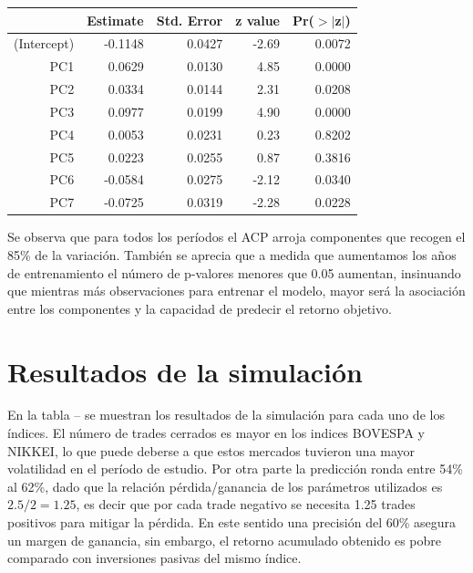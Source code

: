 \documentclass[a4paper,12pt]{Latex/Classes/PhDthesisPSnPDF}
\begin{document}
\begin{center}
\begin{table}[ht]
\centering
\begin{tabular}{rrrrr}
  \hline
 & Estimate & Std. Error & z value & Pr($>$$|$z$|$) \\ 
  \hline
(Intercept) & -0.1148 & 0.0427 & -2.69 & 0.0072 \\ 
  PC1 & 0.0629 & 0.0130 & 4.85 & 0.0000 \\ 
  PC2 & 0.0334 & 0.0144 & 2.31 & 0.0208 \\ 
  PC3 & 0.0977 & 0.0199 & 4.90 & 0.0000 \\ 
  PC4 & 0.0053 & 0.0231 & 0.23 & 0.8202 \\ 
  PC5 & 0.0223 & 0.0255 & 0.87 & 0.3816 \\ 
  PC6 & -0.0584 & 0.0275 & -2.12 & 0.0340 \\ 
  PC7 & -0.0725 & 0.0319 & -2.28 & 0.0228 \\ 
   \hline
\end{tabular}
\end{table}\end{center}

Se observa que para todos los períodos el ACP arroja componentes que recogen el 85\% de la variación. También se aprecia que a medida que aumentamos los años de entrenamiento el número de p-valores menores que 0.05 aumentan, insinuando que mientras más observaciones para entrenar el modelo, mayor será la asociación entre los componentes y la capacidad de predecir el retorno objetivo.

\section{Resultados de la simulación}


En la tabla -- se muestran los resultados de la simulación para cada uno de los índices. El número de trades cerrados es mayor en los indices BOVESPA y NIKKEI, lo que puede deberse a que estos mercados tuvieron una mayor volatilidad en el período de estudio. Por otra parte la predicción ronda entre 54\% al 62\%, dado que la relación pérdida/ganancia de los parámetros utilizados es $2.5/2 = 1.25$, es decir que por cada trade negativo se necesita 1.25 trades positivos para mitigar la pérdida. En este sentido una precisión del 60\% asegura un margen de ganancia, sin embargo, el retorno acumulado obtenido es pobre comparado con inversiones pasivas del mismo índice. 
\end{document}
